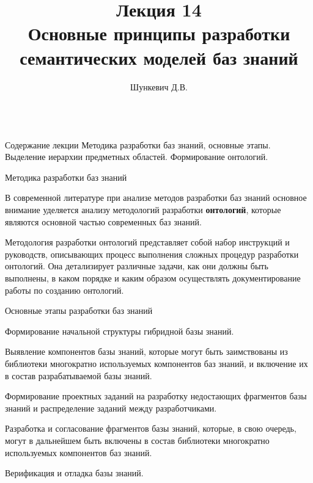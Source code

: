 \title{Лекция 14\\Основные принципы разработки семантических моделей баз знаний}
\author[]{Шункевич Д.В.}

\begin{frame}
	\titlepage
\end{frame}

\begin{frame}{\\Содержание лекции}
	\topline
	\justifying
	Методика разработки баз знаний, основные этапы. Выделение иерархии предметных областей. Формирование онтологий.
\end{frame}

\begin{frame}{Методика разработки баз знаний}
	\topline
	\justifying 
	\begin{SCn}
	В современной литературе при анализе методов разработки баз знаний основное внимание уделяется анализу методологий разработки \textbf{онтологий}, которые являются основной частью современных баз знаний.
 
    Методология разработки онтологий представляет собой набор инструкций и руководств, описывающих процесс выполнения сложных процедур разработки онтологий. Она детализирует различные задачи, как они должны быть выполнены, в каком порядке и каким образом осуществлять документирование работы по созданию онтологий.
	\end{SCn}
\end{frame}

\begin{frame}{Основные этапы разработки баз знаний}
	\topline
	\justifying
	\begin{SCn}
        \vspace{8mm}
	\begin{textitemize}
		\item Формирование начальной структуры гибридной базы знаний.
            \item Выявление компонентов базы знаний, которые могут быть заимствованы из библиотеки многократно используемых компонентов баз знаний, и включение их в состав разрабатываемой базы знаний.
		\item Формирование проектных заданий на разработку недостающих фрагментов базы знаний и распределение заданий между разработчиками.
		\item Разработка и согласование фрагментов базы знаний, которые, в свою очередь, могут в дальнейшем быть включены в состав библиотеки многократно используемых компонентов баз знаний.
		\item Верификация и отладка базы знаний.
	\end{textitemize}
	\end{SCn}
\end{frame}

